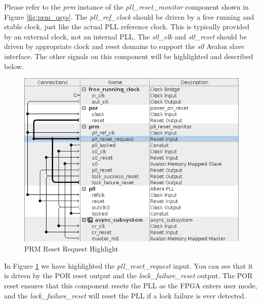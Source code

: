 \documentclass{article}
\begin{document}
\begin{flushleft}
Please refer to the \emph{prm} instance of the \emph{pll\_reset\_monitor} component shown in Figure \ref{fig:prm_qsys}.  The \emph{pll\_ref\_clock} should be driven by a free running and stable clock, just like the actual PLL reference clock.  This is typically provided by an external clock, not an internal PLL.  The \emph{s0\_clk} and \emph{s0\_reset} should be driven by appropriate clock and reset domains to support the \emph{s0} Avalon slave interface.  The other signals on this component will be highlighted and described below.

\begin{figure}[H]
\centering
\includegraphics[scale=0.675]{prm_pll_reset_request}
\caption{PRM Reset Request Highlight}
\label{fig:prm_pll_reset_request}
\end{figure}

In Figure \ref{fig:prm_pll_reset_request} we have highlighted the \emph{pll\_reset\_request} input.  You can see that it is driven by the POR reset output and the \emph{lock\_failure\_reset} output.  The POR reset ensures that this component resets the PLL as the FPGA enters user mode, and the \emph{lock\_failure\_reset} will reset the PLL if a lock failure is ever detected.


\end{flushleft}
\end{document}
